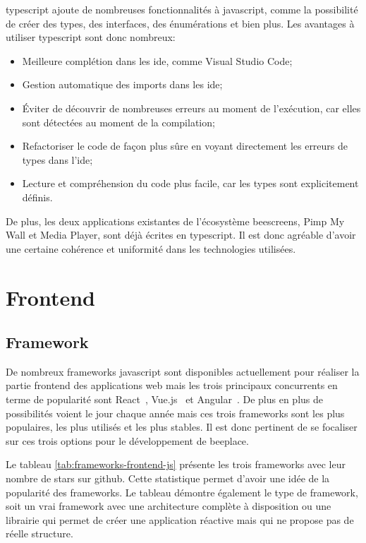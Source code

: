 \gls{typescript} ajoute de nombreuses fonctionnalités à \gls{javascript}, comme la possibilité de créer des types, des interfaces, des énumérations et bien plus. Les avantages à utiliser \gls{typescript} sont donc nombreux:

\begin{itemize}
  \item Meilleure complétion dans les \gls{ide}, comme Visual Studio Code;
  \item Gestion automatique des imports dans les \gls{ide};
  \item Éviter de découvrir de nombreuses erreurs au moment de l'exécution, car elles sont détectées au moment de la compilation;
  \item Refactoriser le code de façon plus sûre en voyant directement les erreurs de types dans l'\gls{ide};
  \item Lecture et compréhension du code plus facile, car les types sont explicitement définis.
\end{itemize}

De plus, les deux applications existantes de l'écosystème \gls{beescreens}, Pimp My Wall et Media Player, sont déjà écrites en \gls{typescript}. Il est donc agréable d'avoir une certaine cohérence et uniformité dans les technologies utilisées.

\section{Frontend}

\subsection{Framework}

De nombreux frameworks \gls{javascript} sont disponibles actuellement pour réaliser la partie frontend des applications web mais les trois principaux concurrents en terme de popularité sont React~\cite{react}, Vue.js~\cite{vue} et Angular~\cite{angular}. De plus en plus de possibilités voient le jour chaque année mais ces trois frameworks sont les plus populaires, les plus utilisés et les plus stables. Il est donc pertinent de se focaliser sur ces trois options pour le développement de \gls{beeplace}.

Le tableau \ref{tab:frameworks-frontend-js} présente les trois frameworks avec leur nombre de stars sur \gls{github}. Cette statistique permet d'avoir une idée de la popularité des frameworks. Le tableau démontre également le type de framework, soit un vrai framework avec une architecture complète à disposition ou une librairie qui permet de créer une application réactive mais qui ne propose pas de réelle structure.

